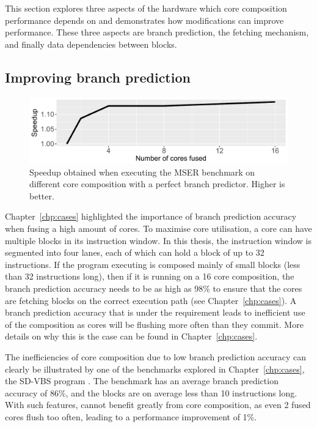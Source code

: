 This section explores three aspects of the hardware which core composition performance depends on and demonstrates how modifications can improve performance.
These three aspects are branch prediction, the fetching mechanism, and finally data dependencies between blocks.

\subsection{Improving branch prediction}

\begin{figure}[t]
    \centering
    \includegraphics[width=1\textwidth]{chapter3/graphics/motiv_branch_mser.pdf}
    \caption{Speedup obtained when executing the MSER benchmark on different core composition with a perfect branch predictor. Higher is better.}
    \label{fig:mser_motiv}
	\vspace{1em}
\end{figure}
Chapter~\ref{chp:cases} highlighted the importance of branch prediction accuracy when fusing a high amount of cores.
To maximise core utilisation, a core can have multiple blocks in its instruction window.
In this thesis, the instruction window is segmented into four lanes, each of which can hold a block of up to 32 instructions.
If the program executing is composed mainly of small blocks (less than 32 instructions long), then if it is running on a 16 core composition, the branch prediction accuracy needs to be as high as 98\% to ensure that the cores are fetching blocks on the correct execution path (see Chapter~\ref{chp:cases}).
A branch prediction accuracy that is under the requirement leads to inefficient use of the composition as cores will be flushing more often than they commit.
More details on why this is the case can be found in Chapter~\ref{chp:cases}.

The inefficiencies of core composition due to low branch prediction accuracy can clearly be illustrated by one of the benchmarks explored in Chapter~\ref{chp:cases}, the SD-VBS program .
The benchmark has an average branch prediction accuracy of 86\%, and the blocks are on average less than 10 instructions long.
With such features,  cannot benefit greatly from core composition, as even 2 fused cores flush too often, leading to a performance improvement of 1\%.

